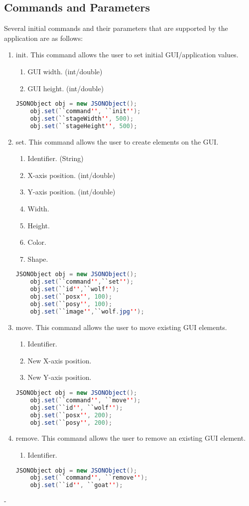 \documentclass[11pt,a4paper]{article}
\begin{document}
\subsection{Commands and Parameters}

Several initial commands and their parameters that are supported by the application are as follows:
\begin{enumerate}
	\item init. This command allows the user to set initial GUI/application values.
		\begin{enumerate}
			\item GUI width. (int/double)
			\item GUI height. (int/double)
		\end{enumerate}
	\begin{lstlisting}[language=java]
	JSONObject obj = new JSONObject();
	obj.set(``command'', ``init'');
	obj.set(``stageWidth'', 500);
	obj.set(``stageHeight'', 500);
	\end{lstlisting}
	\item set. This command allows the user to create elements on the GUI.
		\begin{enumerate}
			\item Identifier. (String)
			\item X-axis position. (int/double)
			\item Y-axis position. (int/double)
			\item Width. 
			\item Height.
			\item Color.
			\item Shape.
		\end{enumerate}
	\begin{lstlisting}[language=java]
	JSONObject obj = new JSONObject();
	obj.set(``command'',``set'');
	obj.set(``id'',``wolf'');
	obj.set(``posx'', 100);
	obj.set(``posy'', 100);
	obj.set(``image'',``wolf.jpg'');
	\end{lstlisting}
	\item move. This command allows the user to move existing GUI elements.
		\begin{enumerate}
			\item Identifier.
			\item New X-axis position.
			\item New Y-axis position.
		\end{enumerate}
	\begin{lstlisting}[language=java]
	JSONObject obj = new JSONObject();
	obj.set(``command'', ``move'');
	obj.set(``id'', ``wolf'');
	obj.set(``posx'', 200);
	obj.set(``posy'', 200);
	\end{lstlisting}
	\item remove. This command allows the user to remove an existing GUI element.
		\begin{enumerate}
			\item Identifier.
		\end{enumerate}
	\begin{lstlisting}[language=java]
	JSONObject obj = new JSONObject();
	obj.set(``command'', ``remove'');
	obj.set(``id'', ``goat'');
	\end{lstlisting}
\end{enumerate}-
\end{document}
